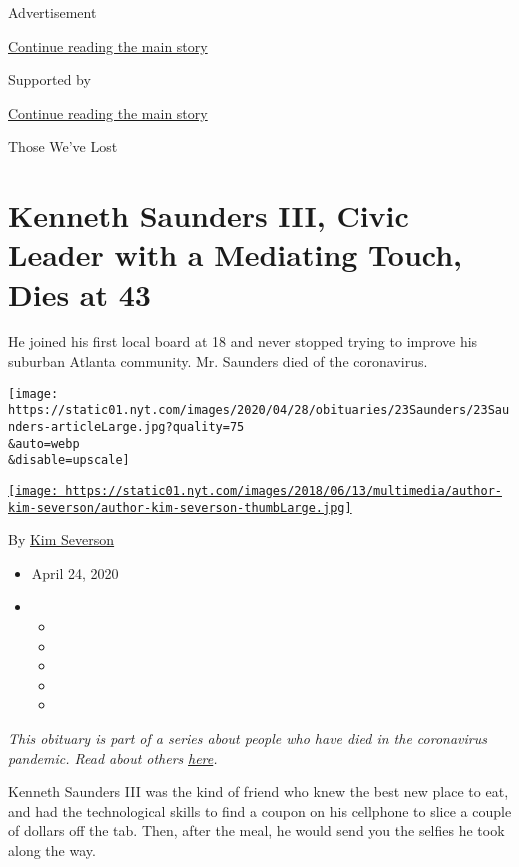 Advertisement

\protect\hyperlink{after-top}{Continue reading the main story}

Supported by

\protect\hyperlink{after-sponsor}{Continue reading the main story}

Those We've Lost

\hypertarget{kenneth-saunders-iii-civic-leader-with-a-mediating-touch-dies-at-43}{%
\section{Kenneth Saunders III, Civic Leader with a Mediating Touch, Dies
at
43}\label{kenneth-saunders-iii-civic-leader-with-a-mediating-touch-dies-at-43}}

He joined his first local board at 18 and never stopped trying to
improve his suburban Atlanta community. Mr. Saunders died of the
coronavirus.

\texttt{[image: https://static01.nyt.com/images/2020/04/28/obituaries/23Saunders/23Saunders-articleLarge.jpg?quality=75\\\&auto=webp\\\&disable=upscale]}

\href{https://www.nytimes.com/by/kim-severson}{\texttt{[image: https://static01.nyt.com/images/2018/06/13/multimedia/author-kim-severson/author-kim-severson-thumbLarge.jpg]}}

By \href{https://www.nytimes.com/by/kim-severson}{Kim Severson}

\begin{itemize}
\item
  April 24, 2020
\item
  \begin{itemize}
  \item
  \item
  \item
  \item
  \item
  \end{itemize}
\end{itemize}

\emph{This obituary is part of a series about people who have died in
the coronavirus pandemic. Read about others}
\href{https://www.nytimes.com/series/people-who-have-died-of-the-coronavirus}{\emph{here}}\emph{.}

Kenneth Saunders III was the kind of friend who knew the best new place
to eat, and had the technological skills to find a coupon on his
cellphone to slice a couple of dollars off the tab. Then, after the
meal, he would send you the selfies he took along the way.

